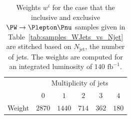 \documentclass[twocolumn,epjc3]{svjour3}
\newcommand{\jet}{\ensuremath{\textrm{jet}}\xspace}
\newcommand{\fbinv}{\ensuremath{\textrm{~fb}^{-1}}\xspace}
\begin{document}
\begin{table}
\caption{
  Weights $w^{i}$ for the case that the inclusive and exclusive $\PW \to \Plepton\Pnu$ samples 
  given in Table~\ref{tab:samples_WJets_vs_Njet}
  are stitched based on $N_{\jet}$, the number of jets.
  The weights are computed for an integrated luminosity of $140\fbinv$.
}
\label{tab:weights_WJets_vs_Njet}
\begin{center}
\begin{tabular}{l|ccccc}
\hline
 & \multicolumn{5}{c}{Multiplicity of jets} \\
 & $0$ & $1$ & $2$ & $3$ & $4$ \\
\hline
Weight & $2870$ & $1440$ & $714$ & $362$ & $180$ \\
\hline
\end{tabular}
\end{center}
\end{table}

\end{document}

